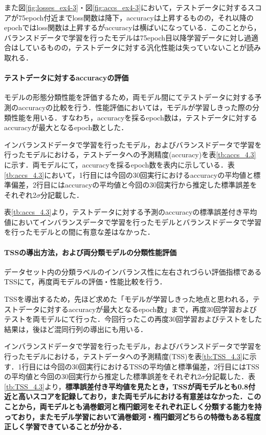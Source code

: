 \documentclass[a4j, 11pt]{jreport}
\begin{document}
また図\ref{fig:losses_ex4-3}・図\ref{fig:accs_ex4-3}において，テストデータに対するスコアが75epoch付近までloss関数は降下，accuracyは上昇するものの，それ以降のepochではloss関数は上昇するがaccuracyは横ばいになっている．このことから，バランスドデータで学習を行ったモデルは75epoch目以降学習データに対し過適合はしているものの，テストデータに対する汎化性能は失っていないことが読み取れる．

\paragraph{テストデータに対するaccuracyの評価}
モデルの形態分類性能を評価するため，両モデル間にてテストデータに対する予測のaccuracyの比較を行う．性能評価においては，モデルが学習しきった際の分類性能を用いる．すなわち，accuracyを採るepoch数は，テストデータに対するaccuracyが最大となるepoch数とした．


インバランスドデータで学習を行ったモデル，およびバランスドデータで学習を行ったモデルにおける，テストデータへの予測精度(accuracy)を表\ref{tb:accs_4.3}に示す．両モデルにて，accuracyを採るepoch数を表内に示している．表\ref{tb:accs_4.3}において，1行目には今回の30回実行におけるaccuracyの平均値と標準偏差，2行目にはaccuracyの平均値と今回の30回実行から推定した標準誤差をそれぞれ2$\sigma$分記載した．

表\ref{tb:accs_4.3}より，テストデータに対する予測のaccuracyの標準誤差付き平均値においてインバランスデータで学習を行ったモデルとバランスドデータで学習を行ったモデルとの間に有意な差はなかった．

\paragraph{TSSの導出方法，および両分類モデルの分類性能評価}
データセット内の分類ラベルのインバランス性に左右されづらい評価指標であるTSSにて，再度両モデルの評価・性能比較を行う．

TSSを導出するため，先ほど求めた「モデルが学習しきった地点と思われる，テストデータに対するaccuracyが最大となるepoch数」まで，再度30回学習およびテストを両モデルにて行った．今回行ったこの再度30回学習およびテストをした結果は，後ほど混同行列の導出にも用いる．

インバランスドデータで学習を行ったモデル，およびバランスドデータで学習を行ったモデルにおける，テストデータへの予測精度(TSS)を表\ref{tb:TSS_4.3}に示す．1行目には今回の30回実行におけるTSSの平均値と標準偏差，2行目にはTSSの平均値と今回の30回実行から推定した標準誤差をそれぞれ2$\sigma$分記載した．表\ref{tb:TSS_4.3}より，\textbf{標準誤差付き平均値を見たとき，TSSが両モデルとも0.8付近と高いスコアを記録しており，また両モデルにおける有意差はなかった．このことから，両モデルとも渦巻銀河と楕円銀河をそれぞれ正しく分類する能力を持っており，またモデル学習において渦巻銀河・楕円銀河どちらの特徴もある程度正しく学習できていることが分かる．}
\end{document}
